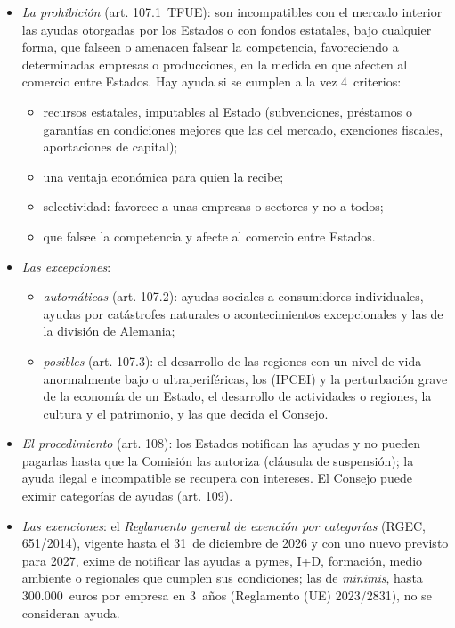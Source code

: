 \documentclass[11pt]{article}
\begin{document}
\begin{itemize}
\item \emph{La prohibición} (art. 107.1~TFUE): son incompatibles con el mercado interior las ayudas otorgadas por los Estados o con fondos estatales, bajo cualquier forma, que falseen o amenacen falsear la competencia, favoreciendo a determinadas empresas o producciones, en la medida en que afecten al comercio entre Estados. Hay ayuda si se cumplen a la vez 4~criterios:
  \begin{itemize}
  \item recursos estatales, imputables al Estado (subvenciones, préstamos o garantías en condiciones mejores que las del mercado, exenciones fiscales, aportaciones de capital);
  \item una ventaja económica para quien la recibe;
  \item selectividad: favorece a unas empresas o sectores y no a todos;
  \item que falsee la competencia y afecte al comercio entre Estados.
  \end{itemize}
\item \emph{Las excepciones}:
  \begin{itemize}
  \item \emph{automáticas} (art. 107.2): ayudas sociales a consumidores individuales, ayudas por catástrofes naturales o acontecimientos excepcionales y las de la división de Alemania;
  \item \emph{posibles} (art. 107.3): el desarrollo de las regiones con un nivel de vida anormalmente bajo o ultraperiféricas, los  (IPCEI) y la perturbación grave de la economía de un Estado, el desarrollo de actividades o regiones, la cultura y el patrimonio, y las que decida el Consejo.
  \end{itemize}
\item \emph{El procedimiento} (art. 108): los Estados notifican las ayudas y no pueden pagarlas hasta que la Comisión las autoriza (cláusula de suspensión); la ayuda ilegal e incompatible se recupera con intereses. El Consejo puede eximir categorías de ayudas (art. 109).
\item \emph{Las exenciones}: el \emph{Reglamento general de exención por categorías} (RGEC, 651/2014), vigente hasta el 31~de diciembre de 2026 y con uno nuevo previsto para 2027, exime de notificar las ayudas a pymes, I+D, formación, medio ambiente o regionales que cumplen sus condiciones; las de \emph{minimis}, hasta 300.000~euros por empresa en 3~años (Reglamento (UE) 2023/2831), no se consideran ayuda\nocite{UE2023Minimis,CE2026RGEC}.

\end{itemize}
\end{document}
